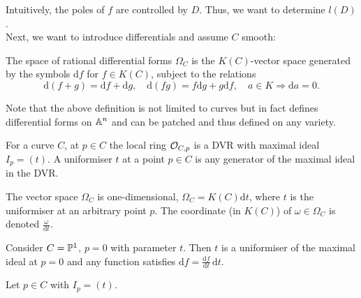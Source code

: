\documentclass[a4paper,11pt]{article}
\begin{document}
			\noindent Intuitively, the poles of $f$ are controlled by $D$. Thus, we want to determine $l(D)$.
			\\

			Next, we want to introduce differentials and assume $C$ smooth:

			\begin{defi}\label{def--differentials1}
				The space of rational differential forms $\Omega_C$ is the $K(C)$-vector space generated by the symbols $\mathrm{d}f$ for $f\in K(C)$, subject to the relations
				\begin{equation*}
					\mathrm{d}(f+g)=\mathrm{d}f+\mathrm{d}g,\quad \mathrm{d}(fg)=f\mathrm{d}g+g\mathrm{d}f,\quad a\in K\Longrightarrow \mathrm{d}a=0.
				\end{equation*}	 
			\end{defi}

			\noindent Note that the above definition is not limited to curves but in fact defines differential forms on $\AA^n$ and can be patched and thus defined on any variety.

			\begin{defi}
				For a curve $C$, at $p\in C$ the local ring $\O_{C,p}$ is a DVR with maximal ideal $I_p=(t)$. A uniformiser $t$ at a point $p\in C$ is any generator of the maximal ideal in the DVR.
			\end{defi}

			\begin{prop}
				The vector space $\Omega_C$ is one-dimensional, $\Omega_C=K(C)\mathrm{d}t$, where $t$ is the uniformiser at an arbitrary point $p$. The coordinate (in $K(C)$) of $\omega\in\Omega_C$ is denoted $\frac{\omega}{\mathrm{d}t}$.
			\end{prop}

			\begin{eg}
				Consider $C=\P^1$, $p=0$ with parameter $t$. Then $t$ is a uniformiser of the maximal ideal at $p=0$ and any function satisfies $\mathrm{d}f=\frac{\mathrm{d}f}{\mathrm{d}t}\,\mathrm{d}t$.
			\end{eg}

			Let $p\in C$ with $I_p=(t)$.
\end{document}
